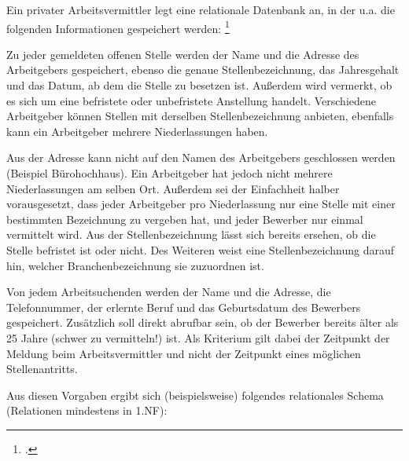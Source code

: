 \documentclass{lehramt-informatik-aufgabe}
\begin{document}

\let\fa=\liFunktionaleAbhaengigkeit
\let\m=\liAttributMenge
\let\r=\liRelationMenge

Ein privater Arbeitsvermittler legt eine relationale Datenbank an, in
der u.a. die folgenden Informationen gespeichert werden:
\footcite[Aufgabe 6]{db:ab:7}

Zu jeder gemeldeten offenen Stelle werden der Name und die Adresse des
Arbeitgebers gespeichert, ebenso die genaue Stellenbezeichnung, das
Jahresgehalt und das Datum, ab dem die Stelle zu besetzen ist. Außerdem
wird vermerkt, ob es sich um eine befristete oder unbefristete
Anstellung handelt. Verschiedene Arbeitgeber können Stellen mit
derselben Stellenbezeichnung anbieten, ebenfalls kann ein Arbeitgeber
mehrere Niederlassungen haben.

Aus der Adresse kann nicht auf den Namen des Arbeitgebers geschlossen
werden (Beispiel Bürohochhaus). Ein Arbeitgeber hat jedoch nicht mehrere
Niederlassungen am selben Ort. Außerdem sei der Einfachheit halber
vorausgesetzt, dass jeder Arbeitgeber pro Niederlassung nur eine Stelle
mit einer bestimmten Bezeichnung zu vergeben hat, und jeder Bewerber nur
einmal vermittelt wird. Aus der Stellenbezeichnung lässt sich bereits
ersehen, ob die Stelle befristet ist oder nicht. Des Weiteren weist eine
Stellenbezeichnung darauf hin, welcher Branchenbezeichnung sie
zuzuordnen ist.

Von jedem Arbeitsuchenden werden der Name und die Adresse, die
Telefonnummer, der erlernte Beruf und das Geburtsdatum des Bewerbers
gespeichert. Zusätzlich soll direkt abrufbar sein, ob der Bewerber
bereits älter als 25 Jahre (schwer zu vermitteln!) ist. Als Kriterium
gilt dabei der Zeitpunkt der Meldung beim Arbeitsvermittler und nicht
der Zeitpunkt eines möglichen Stellenantritts.

Aus diesen Vorgaben ergibt sich (beispielsweise) folgendes relationales
Schema (Relationen mindestens in 1.NF):
\end{document}
